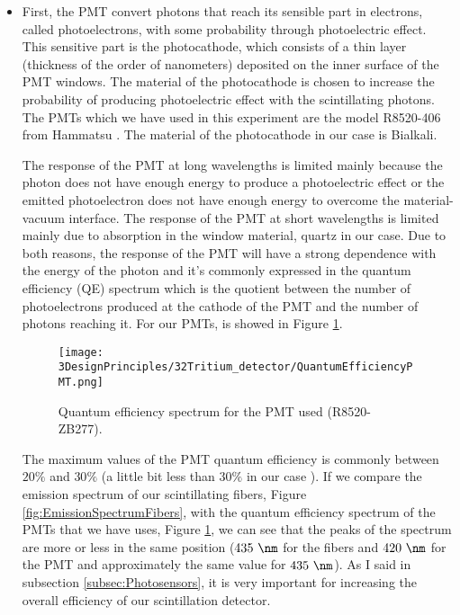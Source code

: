 \begin{itemize}
\item{} First, the PMT convert photons that reach its sensible part in electrons, called photoelectrons, with some probability through photoelectric effect. This sensitive part is the photocathode, which consists of a thin layer (thickness of the order of nanometers) deposited on the inner surface of the PMT windows. The material of the photocathode is chosen to increase the probability of producing photoelectric effect with the scintillating photons. The PMTs which we have used in this experiment are the model R8520-406 from Hammatsu \cite{DataSheetPMTs}. The material of the photocathode in our case is Bialkali.

The response of the PMT at long wavelengths is limited mainly because the photon does not have enough energy to produce a photoelectric effect or the emitted photoelectron does not have enough energy to overcome the material-vacuum interface. The response of the PMT at short wavelengths is limited mainly due to absorption in the window material, quartz in our case. Due to both reasons, the response of the PMT will have a strong dependence with the energy of the photon and it's commonly expressed in the quantum efficiency (QE) spectrum which is the quotient between the number of photoelectrons produced at the cathode of the PMT and the number of photons reaching it. For our PMTs, is showed in Figure \ref{fig:QuantumEfficiencyPMT}.

\begin{figure}[htbp]
\centering
\texttt{[image: 3DesignPrinciples/32Tritium\_detector/QuantumEfficiencyPMT.png]}
\caption{Quantum efficiency spectrum for the PMT used (R8520-ZB277).\label{fig:QuantumEfficiencyPMT}~\cite{DataSheetPMTs}}
\end{figure}

The maximum values of the PMT quantum efficiency is commonly between $20\%$ and $30\%$ \cite{Knoll} (a little bit less than $30\%$ in our case \cite{DataSheetPMTs}). If we compare the emission spectrum of our scintillating fibers, Figure \ref{fig:EmissionSpectrumFibers}, with the quantum efficiency spectrum of the PMTs that we have uses, Figure \ref{fig:QuantumEfficiencyPMT}, we can see that the peaks of the spectrum are more or less in the same position ($435~\nm$ for the fibers and $420~\nm$ for the PMT and approximately the same value for $435~\nm$). As I said in subsection \ref{subsec:Photosensors}, it is very important for increasing the overall efficiency of our scintillation detector. 


\end{itemize}

